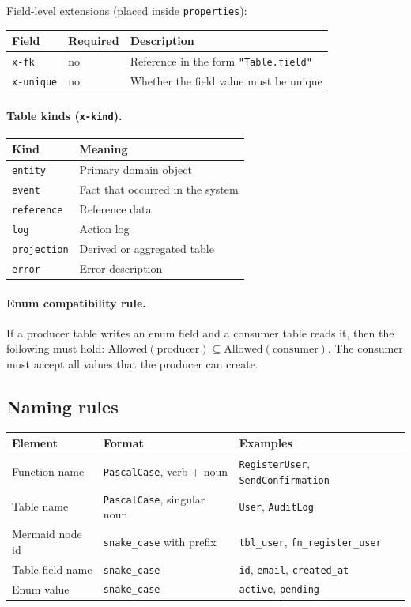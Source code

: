 \vspace{0.5em}
Field-level extensions (placed inside \texttt{properties}):

\begin{tabular}{lll}
\hline
\textbf{Field} & \textbf{Required} & \textbf{Description} \\
\hline
\texttt{x-fk} & no & Reference in the form \texttt{"Table.field"} \\
\texttt{x-unique} & no & Whether the field value must be unique \\
\hline
\end{tabular}

\paragraph{Table kinds (\texttt{x-kind}).}

\begin{tabular}{ll}
\hline
\textbf{Kind} & \textbf{Meaning} \\
\hline
\texttt{entity} & Primary domain object \\
\texttt{event} & Fact that occurred in the system \\
\texttt{reference} & Reference data \\
\texttt{log} & Action log \\
\texttt{projection} & Derived or aggregated table \\
\texttt{error} & Error description \\
\hline
\end{tabular}

\paragraph{Enum compatibility rule.}

If a producer table writes an enum field and a consumer table reads it, then the following must hold: $\mathrm{Allowed}(\mathrm{producer}) \subseteq \mathrm{Allowed}(\mathrm{consumer})$. The consumer must accept all values that the producer can create.

\subsection{Naming rules}

\begin{tabular}{lll}
\hline
\textbf{Element} & \textbf{Format} & \textbf{Examples} \\
\hline
Function name & \texttt{PascalCase}, verb + noun & \texttt{RegisterUser}, \texttt{SendConfirmation} \\
Table name & \texttt{PascalCase}, singular noun & \texttt{User}, \texttt{AuditLog} \\
Mermaid node id & \texttt{snake\_case} with prefix & \texttt{tbl\_user}, \texttt{fn\_register\_user} \\
Table field name & \texttt{snake\_case} & \texttt{id}, \texttt{email}, \texttt{created\_at} \\
Enum value & \texttt{snake\_case} & \texttt{active}, \texttt{pending} \\
\hline
\end{tabular}

